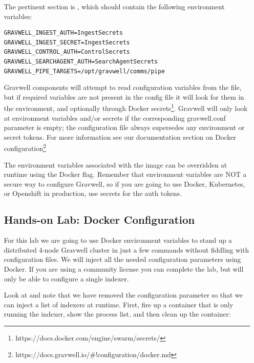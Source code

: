 
The pertinent section is , which should contain the
following environment variables:

\begin{Verbatim}[breaklines=true]
GRAVWELL_INGEST_AUTH=IngestSecrets
GRAVWELL_INGEST_SECRET=IngestSecrets
GRAVWELL_CONTROL_AUTH=ControlSecrets
GRAVWELL_SEARCHAGENT_AUTH=SearchAgentSecrets
GRAVWELL_PIPE_TARGETS=/opt/gravwell/comms/pipe
\end{Verbatim}

Gravwell components will attempt to read configuration variables from
the  file, but if required variables are not present in
the config file it will look for them in the environment, and
optionally through Docker
secrets\footnote{https://docs.docker.com/engine/swarm/secrets/}. Gravwell
will only look at environment variables and/or secrets if the corresponding
gravwell.conf parameter is empty; the configuration file always
supersedes any environment or secret tokens. For more information see
our documentation section on Docker
configuration\footnote{https://docs.gravwell.io/\#!configuration/docker.md}

The environment variables associated with the image can be overridden
at runtime using the  Docker flag. Remember that environment
variables are NOT a secure way to configure Gravwell, so if you are going
to use Docker, Kubernetes, or Openshift in production, use secrets
for the auth tokens.

\clearpage
\subsection{Hands-on Lab: Docker Configuration}

For this lab we are going to use Docker environment variables to stand
up a distributed 4-node Gravwell cluster in just a few commands without
fiddling with configuration files. We will inject all the needed
configuration parameters using Docker. If you are using a community
license you can complete the lab, but will only be able to configure a
single indexer.

Look at 
and note that we have removed the 
configuration parameter so that we can inject a list of
indexers at runtime. First, fire up a container that is only running the
indexer, show the process list, and then clean up the container:

